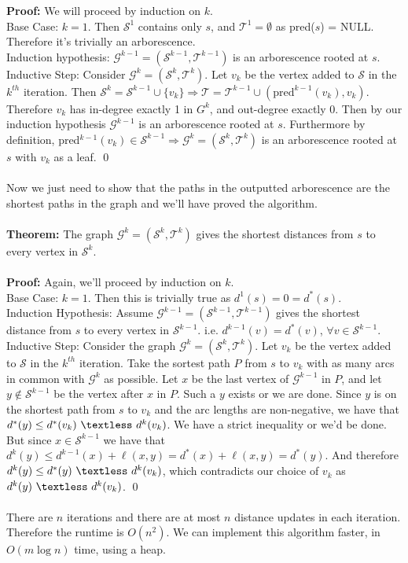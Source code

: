 \documentclass{article}
\newcommand{\emp}{\emptyset}
\newcommand{\lt}{\textless}
\newcommand{\imply}{\Rightarrow}
\newcommand{\thm}{\textbf{Theorem: }}
\newcommand{\proo}{\textbf{Proof: }}
\newcommand{\mcal}[1]{\mathcal{#1}}
\begin{document}
\proo We will proceed by induction on $k$.\\
Base Case: $k=1$. Then $\mcal{S}^1$ contains only $s$, and $\mcal{T}^1= \emp$ as pred($s$) = NULL. Therefore it's trivially an arborescence.\\
Induction hypothesis: $\mcal{G}^{k-1} = (\mcal{S}^{k-1}, \mcal{T}^{k-1})$ is an arborescence rooted at $s$.\\
Inductive Step: Consider $\mcal{G}^k = (\mcal{S}^k, \mcal{T}^k)$. Let $v_k$ be the vertex added to $\mcal{S}$ in the $k^{th}$ iteration. Then $\mcal{S}^k = \mcal{S}^{k-1} \cup \{v_k\} \imply \mcal{T} = \mcal{T}^{k-1} \cup (\text{pred}^{k-1}(v_k), v_k)$. Therefore $v_k$ has in-degree exactly 1 in $G^k$, and out-degree exactly 0. Then by our induction hypothesis $\mcal{G}^{k-1}$ is an arborescence rooted at $s$. Furthermore by definition, pred$^{k-1}(v_k) \in \mcal{S}^{k-1} \imply \mcal{G}^k = (\mcal{S}^k, \mcal{T}^k)$ is an arborescence rooted at $s$ with $v_k$ as a leaf.
\qed\\\\
Now we just need to show that the paths in the outputted arborescence are the shortest paths in the graph and we'll have proved the algorithm.\\\\
\thm The graph $\mcal{G}^k = (\mcal{S}^k, \mcal{T}^k)$ gives the shortest distances from $s$ to every vertex in $\mcal{S}^k$.\\\\
\proo Again, we'll proceed by induction on $k$.\\
Base Case: $k=1$. Then this is trivially true as $d^1(s) = 0 = d^*(s)$.\\
Induction Hypothesis: Assume $\mcal{G}^{k-1} = (\mcal{S}^{k-1}, \mcal{T}^{k-1})$ gives the shortest distance from $s$ to every vertex in $\mcal{S}^{k-1}$. i.e. $d^{k-1}(v) = d^*(v)$, $\forall v \in \mcal{S}^{k-1}$.\\
Inductive Step: Consider the graph $\mcal{G}^{k} = (\mcal{S}^k, \mcal{T}^k)$. Let $v_k$ be the vertex added to $\mcal{S}$ in the $k^{th}$ iteration. Take the sortest path $P$ from $s$ to $v_k$ with as many arcs in common with $\mcal{G}^k$ as possible. Let $x$ be the last vertex of $\mcal{G}^{k-1}$ in $P$, and let $y \notin \mcal{S}^{k-1}$ be the vertex after $x$ in $P$. Such a $y$ exists or we are done. Since $y$ is on the shortest path from $s$ to $v_k$ and the arc lengths are non-negative, we have that $d^*(y) \leq d^*(v_k)\ \lt\ d^k(v_k)$. We have a strict inequality or we'd be done. But since $x \in \mcal{S}^{k-1}$ we have that $d^k(y) \leq d^{k-1}(x) + \ell(x, y) = d^*(x) + \ell(x, y) = d^*(y)$. And therefore $d^k(y) \leq d^*(y)\ \lt\ d^k(v_k)$, which contradicts our choice of $v_k$ as $d^k(y)\ \lt\ d^k(v_k)$.
\qed\\\\
There are $n$ iterations and there are at most $n$ distance updates in each iteration. Therefore the runtime is $O(n^2)$. We can implement this algorithm faster, in $O(m \log n)$ time, using a heap.\\
\end{document}
